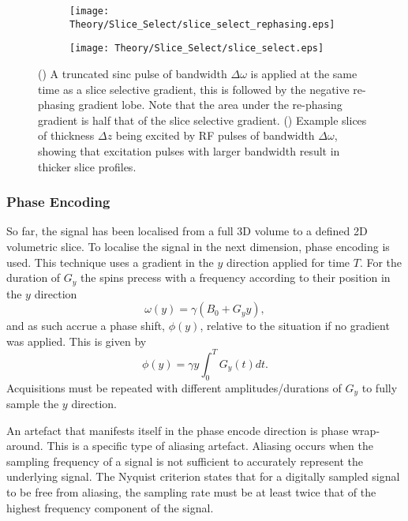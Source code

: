 \begin{figure}[H]
	\centering
	\begin{subfigure}[c]{0.47\textwidth}
		\centering
		\texttt{[image: Theory/Slice\_Select/slice\_select\_rephasing.eps]}
		\caption{}
		\label{fig:theory_slice_select_rephasing}
	\end{subfigure}
	\hfill
	\begin{subfigure}[c]{0.47\textwidth}
		\centering
		\texttt{[image: Theory/Slice\_Select/slice\_select.eps]}
		\caption{}
		\label{fig:theory_slice_select_profile}
	\end{subfigure}
	\caption{() A truncated sinc pulse of bandwidth $\Delta \omega$ is applied at the same time as a slice selective gradient, this is followed by the negative re-phasing gradient lobe. Note that the area under the re-phasing gradient is half that of the slice selective gradient. () Example slices of thickness $\Delta z$ being excited by \ac{RF} pulses of bandwidth $\Delta \omega$, showing that excitation pulses with larger bandwidth result in thicker slice profiles.}
	\label{fig:theory_slice_select}
\end{figure}

\subsubsection{Phase Encoding}
So far, the signal has been localised from a full 3D volume to a defined 2D volumetric slice. To localise the signal in the next dimension, phase encoding is used. This technique uses a gradient in the $y$ direction applied for time $T$. For the duration of $G_y$ the spins precess with a frequency according to their position in the $y$ direction
\begin{equation}
\omega \left( y\right) = \gamma\left( B_0 + G_yy\right),
\end{equation}
and as such accrue a phase shift, $\phi \left( y \right)$, relative to the situation if no gradient was applied. This is given by 
\begin{equation}
\phi\left( y\right)  = \gamma y \int_{0}^{T} G_y\left( t\right) dt.
\end{equation}
Acquisitions must be repeated with different amplitudes/durations of $G_y$ to fully sample the $y$ direction.

An artefact that manifests itself in the phase encode direction is phase wrap-around. This is a specific type of aliasing artefact. Aliasing occurs when the sampling frequency of a signal is not sufficient to accurately represent the underlying signal. The Nyquist criterion states that for a digitally sampled signal to be free from aliasing, the sampling rate must be at least twice that of the highest frequency component of the signal.

